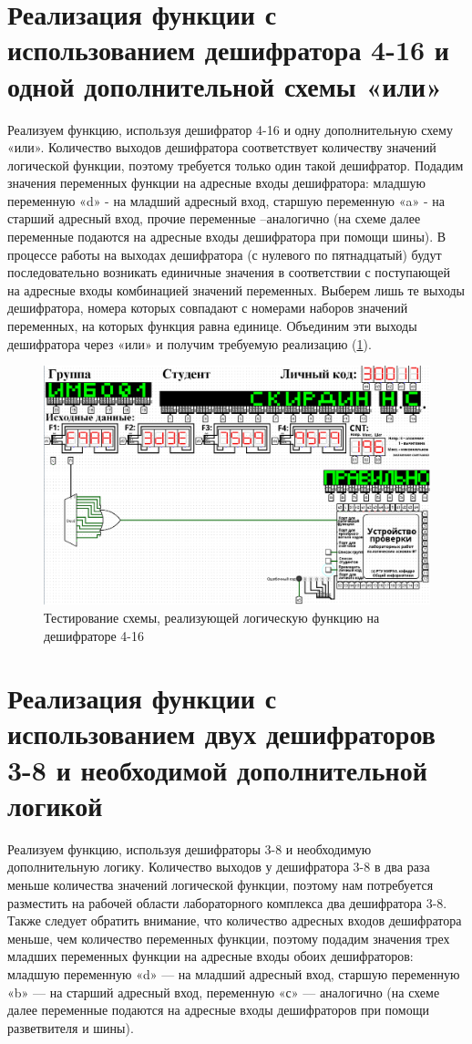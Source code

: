 \documentclass[14pt, a4paper]{extreport}
\begin{document}
\section{Реализация функции с использованием дешифратора 4-16 и одной дополнительной схемы «или»}
Реализуем функцию, используя дешифратор 4-16 и одну дополнительную схему «или». Количество выходов дешифратора соответствует количеству значений логической функции, поэтому требуется только один такой дешифратор. Подадим значения переменных функции на адресные входы дешифратора: младшую переменную «d» - на младший адресный вход, старшую переменную «a» - на старший адресный вход, прочие переменные –аналогично (на схеме далее переменные подаются на адресные входы дешифратора при помощи шины). В процессе работы на выходах дешифратора (с нулевого по пятнадцатый) будут последовательно возникать единичные значения в соответствии с поступающей на адресные входы комбинацией значений переменных. Выберем лишь те выходы дешифратора, номера которых совпадают с номерами наборов значений переменных, на которых функция равна единице. Объединим эти выходы дешифратора через «или» и получим требуемую реализацию (\cref{fig:decoder-4-16}).
\begin{figure}[H]
	\caption{Тестирование схемы, реализующей логическую функцию на дешифраторе 4-16}
	\label{fig:decoder-4-16}
	\includegraphics[width=\textwidth]{decoder-4-16}
\end{figure}

\section{Реализация функции с использованием двух дешифраторов 3-8 и необходимой дополнительной логикой}
Реализуем функцию, используя дешифраторы 3-8 и необходимую дополнительную логику. Количество выходов у дешифратора 3-8 в два раза меньше количества значений логической функции, поэтому нам потребуется разместить на рабочей области лабораторного комплекса два дешифратора 3-8. Также следует обратить внимание, что количество адресных входов дешифратора меньше, чем количество переменных функции, поэтому подадим значения трех младших переменных функции на адресные входы обоих дешифраторов: младшую переменную «d» — на младший адресный вход, старшую переменную «b» — на старший адресный вход, переменную «с» — аналогично (на схеме далее переменные подаются на адресные входы дешифраторов при помощи разветвителя и шины).
\end{document}
